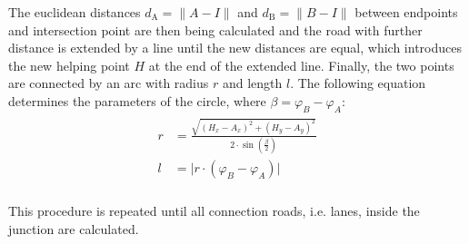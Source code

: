 \documentclass[a4paper, 10pt, conference]{ieeeconf}      %
\begin{document}
    The euclidean distances $d_\text{A} = \|A-I\|$ and $d_\text{B} = \|B-I\|$ between endpoints and intersection point are then being calculated and the road with further distance is extended by a line until the new distances are equal, which introduces the new helping point \(H\) at the end of the extended line. Finally, the two points are connected by an arc with radius \(r\) and length \(l\). The following equation determines the parameters of the circle, where \(\beta = \varphi_B - \varphi_A\):
    \begin{align}
        \begin{split}           
        r &= \frac{\sqrt{\left(H_x - A_x\right)^2 + \left(H_y - A_y\right)^2}}{2 \cdot \sin\left(\frac{\beta}{2}\right)} \\
        l &= \vert r \cdot \left(\varphi_B - \varphi_A\right) \vert \\  
        \end{split}
    \end{align}
    
    This procedure is repeated until all connection roads, i.e. lanes, inside the junction are calculated.
\end{document}
